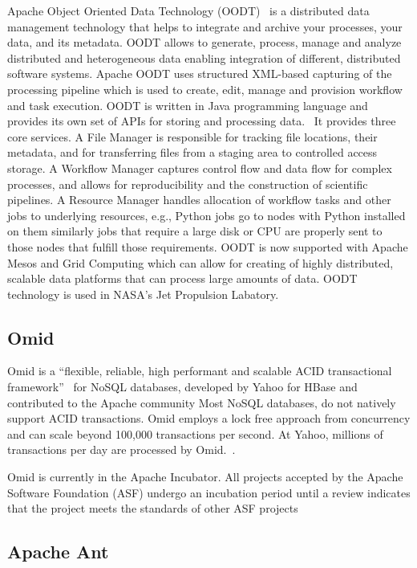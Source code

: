 {Apache Object Oriented Data Technology (OODT)~\cite{www-oodt} is a
distributed data management technology that helps to integrate and
archive your processes, your data, and its metadata. OODT allows to
generate, process, manage and analyze distributed and heterogeneous
data enabling integration of different, distributed software
systems. Apache OODT uses structured XML-based capturing of the
processing pipeline which is used to create, edit, manage and
provision workflow and task execution. OODT is written in Java
programming language and provides its own set of APIs for storing and
processing data.~\cite{www-oodt-documentation} It provides three core
services. A File Manager is responsible for tracking file locations,
their metadata, and for transferring files from a staging area to
controlled access storage. A Workflow Manager captures control flow
and data flow for complex processes, and allows for reproducibility
and the construction of scientific pipelines. A Resource Manager
handles allocation of workflow tasks and other jobs to underlying
resources, e.g., Python jobs go to nodes with Python installed on them
similarly jobs that require a large disk or CPU are properly sent to
those nodes that fulfill those requirements. OODT is now supported
with Apache Mesos and Grid Computing which can allow for creating of
highly distributed, scalable data platforms that can process large
amounts of data. OODT technology is used in NASA's Jet Propulsion
Labatory.

\subsection{Omid \cv}

Omid is a ``flexible, reliable, high performant and scalable ACID
transactional framework''~\cite{www-apacheomid} for NoSQL databases,
developed by Yahoo for HBase and contributed to the Apache community
Most NoSQL databases, do not natively support ACID transactions. Omid
employs a lock free approach from concurrency and can scale beyond
100,000 transactions per second. At Yahoo, millions of transactions
per day are processed by Omid.~\cite{www-yahooomid}.

Omid is currently in the Apache Incubator.  All projects accepted by
the Apache Software Foundation (ASF) undergo an incubation period
until a review indicates that the project meets the standards of other
ASF projects~\cite{www-apacheincubator}


\subsection{Apache Ant}

}
